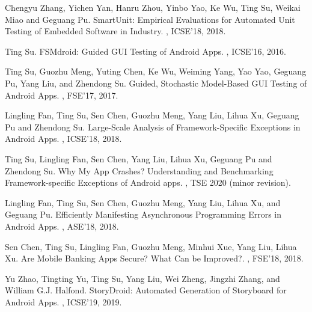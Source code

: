 \documentclass[a4paper]{article}
\begin{document}
{\begin{thebibliography}{99}
	\newblock Chengyu Zhang, Yichen Yan, Hanru Zhou, Yinbo Yao, Ke Wu, Ting Su, Weikai Miao and Geguang Pu.
	\newblock SmartUnit: Empirical Evaluations for Automated Unit Testing of Embedded Software in Industry.
	, ICSE'18, 2018.
	
	\newblock Ting Su.
	\newblock FSMdroid: Guided GUI Testing of Android Apps.
	, ICSE'16, 2016.
	
	\newblock Ting Su, Guozhu Meng, Yuting Chen, Ke Wu, Weiming Yang, Yao Yao, Geguang Pu, Yang Liu, and Zhendong Su.
	\newblock Guided, Stochastic Model-Based GUI Testing of Android Apps.
	, FSE'17, 2017.
	
	\newblock Lingling Fan, Ting Su, Sen Chen, Guozhu Meng, Yang Liu, Lihua Xu, Geguang Pu and Zhendong Su.
	\newblock Large-Scale Analysis of Framework-Specific Exceptions in Android Apps.
	, ICSE'18, 2018.
	
	\newblock Ting Su, Lingling Fan, Sen Chen, Yang Liu, Lihua Xu, Geguang Pu and Zhendong Su.
	\newblock Why My App Crashes? Understanding and Benchmarking
	Framework-specific Exceptions of Android apps. 
	, TSE 2020 (minor revision).
	
	\newblock Lingling Fan, Ting Su, Sen Chen, Guozhu Meng, Yang Liu, Lihua Xu, and Geguang Pu.
	\newblock Efficiently Manifesting Asynchronous Programming Errors in Android Apps.
	, ASE'18, 2018.
	
	\newblock Sen Chen, Ting Su, Lingling Fan, Guozhu Meng, Minhui Xue, Yang Liu, Lihua Xu.
	\newblock Are Mobile Banking Apps Secure? What Can be Improved?.
	, FSE'18, 2018.
	
	\newblock Yu Zhao, Tingting Yu, Ting Su, Yang Liu, Wei Zheng, Jingzhi Zhang, and William G.J. Halfond.
	\newblock StoryDroid: Automated Generation of Storyboard for Android Apps.
	, ICSE'19, 2019.
	

\end{thebibliography}}
\end{document}
